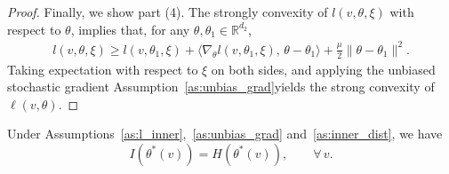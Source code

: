 \documentclass[11 pt]{article}
\begin{document}
\begin{proof}
    Finally, we show part (4). The strongly convexity of $l(v,\theta,\xi)$ with respect to $\theta$, implies that, for any $\theta,\theta_1 \in \mathbb{R}^{d_2}$,
    \begin{align*}
        l(v,\theta,\xi) \geq l(v,\theta_1,\xi) + \langle \nabla_\theta l(v,\theta_1,\xi),\, \theta - \theta_1 \rangle + \frac{\mu}{2} \|\theta-\theta_1\|^2. 
    \end{align*}
    Taking expectation with respect to $\xi$ on both sides, and applying the unbiased stochastic gradient Assumption~\ref{as:unbias_grad}yields the strong convexity of $\ell(v,\theta)$.
\end{proof}



\begin{proposition}\label{prop:hessian_fim_equal}
     Under Assumptions~\ref{as:l_inner},~\ref{as:unbias_grad} and~\ref{as:inner_dist}, we have \[
I(\theta^*(v)) = H(\theta^*(v)), \qquad \forall\, v.
\]
\end{proposition}
\end{document}
